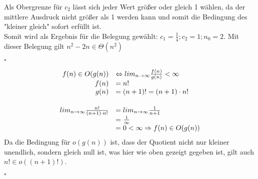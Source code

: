 \documentclass{article}
\begin{document}
Als Obergrenze für $c_2$ lässt sich jeder Wert größer oder gleich 1 wählen, da der mittlere Ausdruck nicht größer als 1 werden kann und somit die Bedingung des "kleiner gleich" sofort erfüllt ist.\\
Somit wird als Ergebnis für die Belegung gewählt: $c_1 = \frac{1}{4}; c_2 = 1; n_0 = 2$.
Mit dieser Belegung gilt $n^2-2n \in \Theta(n^2)$
\begin{flushright}
$\square$
\end{flushright}
\vspace{1cm}
\begin{equation*}
\begin{array}{rl}
	f(n) \in O(g(n)) &\Leftrightarrow lim_{n\rightarrow \infty} \frac{f(n)}{g(n)} < \infty\\
	f(n) &= n!\\
	g(n) &= (n+1)! = (n+1) \cdot n!
	\vspace{0.5cm}\\
	lim_{n\rightarrow \infty} \frac{n!}{(n+1) \cdot n!} &= lim_{n \rightarrow \infty} \frac{1}{n+1}\\
		&= \frac{1}{\infty}\\
		&= 0 < \infty \Rightarrow f(n) \in O(g(n))
\end{array}
\end{equation*}
Da die Bedingung für $o(g(n))$ ist, dass der Quotient nicht nur kleiner unendlich, sondern gleich null ist, was hier wie oben gezeigt gegeben ist, gilt auch $n! \in o((n+1)!)$.
\begin{flushright}
$\square$
\end{flushright}
\end{document}
